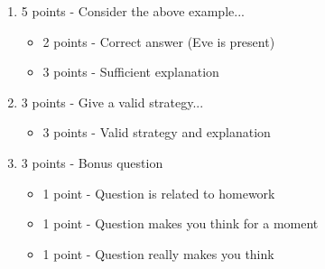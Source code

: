 \documentclass[12pt]{article}
\begin{document}
\begin{enumerate}[font=\bfseries]
    \item 5 points - Consider the above example...
        \begin{itemize}
            \item 2 points - Correct answer (Eve is present)
            \item 3 points - Sufficient explanation
        \end{itemize}
    \item 3 points - Give a valid strategy...
        \begin{itemize}
            \item 3 points - Valid strategy and explanation
        \end{itemize}
    \item 3 points - Bonus question
        \begin{itemize}
            \item 1 point - Question is related to homework
            \item 1 point - Question makes you think for a moment
            \item 1 point - Question really makes you think
        \end{itemize}
\end{enumerate}
\end{document}
